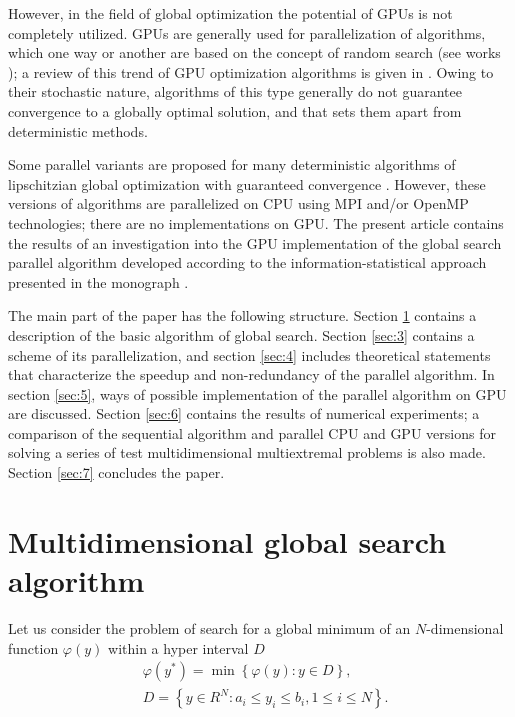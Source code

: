 \documentclass[smallcondensed]{svjour3}     %
\begin{document}
However, in the field of global optimization the potential of GPUs is not completely utilized. GPUs are generally used for parallelization of algorithms, which one way or another are based on the concept of random search (see works \cite{RefFerreiro,RefZhu,RefGarcia,RefMussi}); a review of this trend of GPU optimization algorithms is given in \cite{RefLangdon}. Owing to their stochastic nature, algorithms of this type generally do not guarantee convergence to a globally optimal solution, and that sets them apart from deterministic methods.

Some parallel variants are proposed for many deterministic algorithms of lipschitzian global optimization with guaranteed convergence \cite{RefGergel2005,RefEvtushenko,RefHe,RefPaulavicius}. However, these versions of algorithms are parallelized on CPU using MPI and/or OpenMP technologies; there are no implementations on GPU. The present article contains the results of an investigation into the GPU implementation of the global search parallel algorithm developed according to the information-statistical approach presented in the monograph \cite{RefStrongin2000}.

The main part of the paper has the following structure. Section \ref{sec:2} contains a description of the basic algorithm of global search. Section \ref{sec:3} contains a scheme of its parallelization, and section \ref{sec:4} includes theoretical statements that characterize the speedup and non-redundancy of the parallel algorithm. In section \ref{sec:5}, ways of possible implementation of the parallel algorithm on GPU are discussed. Section \ref{sec:6} contains the results of numerical experiments; a comparison of the sequential algorithm and parallel CPU and GPU versions for solving a series of test multidimensional multiextremal problems is also made. Section \ref{sec:7} concludes the paper.

\section{Multidimensional global search algorithm} \label{sec:2}

Let us consider the problem of search for a global minimum of an $N$-dimensional function $\varphi(y)$ within a hyper interval $D$
\begin{eqnarray}\label{eq:1}
& \varphi(y^\ast)=\min{\left\{\varphi(y):y\in D\right\}},\\
& D=\left\{y\in R^N: a_i\leq y_i \leq b_i, 1\leq i \leq N\right\}. \nonumber
\end{eqnarray}
\end{document}
